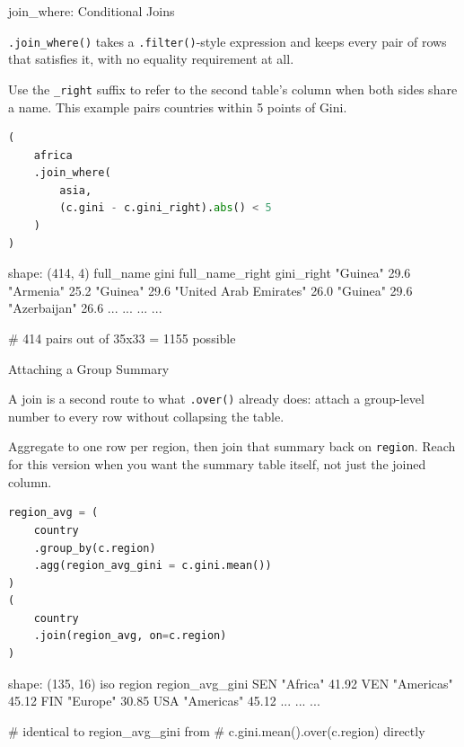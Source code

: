 \documentclass[8pt,aspectratio=169]{beamer}
\begin{document}
\begin{frame}[fragile]{join\_where: Conditional Joins}
\begin{splitcode}{%

\texttt{.join\_where()} takes a \texttt{.filter()}-style expression and keeps every pair of rows that satisfies it, with no equality requirement at all.

Use the \texttt{\_right} suffix to refer to the second table's column when both sides share a name. This example pairs countries within 5 points of Gini.

}
\begin{lstlisting}[language=Python]
(
    africa
    .join_where(
        asia,
        (c.gini - c.gini_right).abs() < 5
    )
)
\end{lstlisting}
\begin{codeoutput}
shape: (414, 4)
full_name  gini  full_name_right         gini_right
"Guinea"   29.6  "Armenia"               25.2
"Guinea"   29.6  "United Arab Emirates"  26.0
"Guinea"   29.6  "Azerbaijan"            26.6
...        ...   ...                    ...

# 414 pairs out of 35x33 = 1155 possible
\end{codeoutput}
\end{splitcode}
\end{frame}

\begin{frame}[fragile]{Attaching a Group Summary}
\begin{splitcode}{%

A join is a second route to what \texttt{.over()} already does: attach a group-level number to every row without collapsing the table.

Aggregate to one row per region, then join that summary back on \texttt{region}. Reach for this version when you want the summary table itself, not just the joined column.

}
\begin{lstlisting}[language=Python]
region_avg = (
    country
    .group_by(c.region)
    .agg(region_avg_gini = c.gini.mean())
)
(
    country
    .join(region_avg, on=c.region)
)
\end{lstlisting}
\begin{codeoutput}
shape: (135, 16)
iso  region      region_avg_gini
SEN  "Africa"    41.92
VEN  "Americas"  45.12
FIN  "Europe"    30.85
USA  "Americas"  45.12
...  ...         ...

# identical to region_avg_gini from
# c.gini.mean().over(c.region) directly
\end{codeoutput}
\end{splitcode}
\end{frame}
\end{document}
